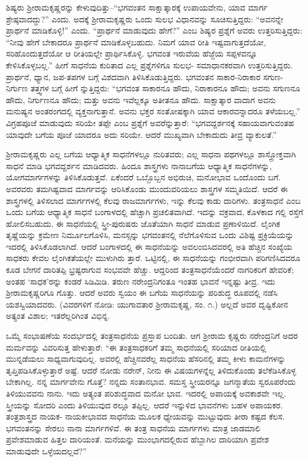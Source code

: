 ಶಿಷ್ಯರು ಶ್ರೀರಾಮಕೃಷ್ಣರನ್ನು ಕೇಳುವುದಿತ್ತು–“ಭಗವಂತನ ಸಾಕ್ಷಾತ್ಕಾರಕ್ಕೆ ಉಪಾಯವೇನು, ಯಾವ ಮಾರ್ಗ ಶ್ರೇಷ್ಠವಾದದ್ದು?” ಎಂದು. ಅದಕ್ಕೆ ಶ್ರೀರಾಮಕೃಷ್ಣರು ಒಂದು ಸುಲಭ ವಿಧಾನವನ್ನು ಸೂಚಿಸುತ್ತಿದ್ದರು: “ಅವನನ್ನೇ ಪ್ರಾರ್ಥನೆ ಮಾಡಿಕೊಳ್ಳಿ!” ಎಂದು. “ಪ್ರಾರ್ಥನೆ ಮಾಡುವುದು ಹೇಗೆ?” ಎಂಬ ಶಿಷ್ಯರ ಪ್ರಶ್ನೆಗೆ ಅವರು ಉತ್ತರಿಸುತ್ತಿದ್ದರು: “ನೀವು ಹೇಗೆ ಬೇಕಾದರೂ ಪ್ರಾರ್ಥನೆ ಮಾಡಿಕೊಳ್ಳಬಹುದು. ನಿಮಗೆ ಯಾವ ರೀತಿ ಇಷ್ಟವಾಗುತ್ತದೆಯೋ, ಸರಿಹೊಂದುತ್ತದೆಯೋ ಆ ರೀತಿಯಲ್ಲೇ ಪ್ರಾರ್ಥಿಸಿಕೊಳ್ಳಿ. ಭಗವಂತ ಇರುವೆಯ ಹೆಜ್ಜೆಯ ಸಪ್ಪಳವನ್ನೂ ಕೇಳಿಸಿಕೊಳ್ಳಬಲ್ಲ.” ಹೀಗೆ ಸಾಧನೆಯ ಕುರಿತಾದ ಎಲ್ಲ ಪ್ರಶ್ನೆಗಳಿಗೂ ಸುಲಭ- ಸಮಾಧಾನಕರವಾಗಿ ಉತ್ತರಿಸುತ್ತಿದ್ದರು. ಪ್ರಾರ್ಥನೆ, ಧ್ಯಾನ, ಜಪ-ತಪಗಳ ಬಗ್ಗೆ ವಿಶದವಾಗಿ ತಿಳಿಸಿಕೊಡುತ್ತಿದ್ದರು. ಭಗವಂತನ ಸಾಕಾರ-ನಿರಾಕಾರ ಸಗುಣ-ನಿರ್ಗುಣ ತತ್ತ್ವಗಳ ಬಗ್ಗೆ ಹೀಗೆ ನ್ನುತ್ತಿದ್ದರು: “ಭಗವಂತ ಸಾಕಾರನೂ ಹೌದು, ನಿರಾಕಾರನೂ ಹೌದು; ಅವನು ಸಗುಣನೂ ಹೌದು, ನಿರ್ಗುಣನೂ ಹೌದು; ಮತ್ತು ಅವನು ಇವೆಲ್ಲಕ್ಕೂ ಅತೀತನೂ ಹೌದು. ಸಾಕ್ಷಾತ್ಕಾರ ವಾದಾಗ ಅವನು ಮನುಷ್ಯನ ಅಂತರಂಗದಲ್ಲಿ ವ್ಯಕ್ತನಾಗುತ್ತಾನೆ. ಅವನು ಭಕ್ತರ ಸಂತೋಷಕ್ಕಾಗಿ ಯಾವ ಆಕಾರವನ್ನಾದರೂ ತಳೆಯಬಲ್ಲ.” ವಿಗ್ರಹಪೂಜೆ ಮಾಡುವುದು ಸರಿಯೇ ತಪ್ಪೇ ಎಂಬ ಪ್ರಶ್ನೆಗೆ ಅವರೆನ್ನುತ್ತಾರೆ: “ಭಗವದ್ದರ್ಶನಕ್ಕೆ ಸಹಾಯವಾಗುವಂತಹ ಯಾವುದೇ ಬಗೆಯ ಪೂಜೆ ಯಾದರೂ ಅದು ಸರಿಯೇ. ಆದರೆ ಮುಖ್ಯವಾಗಿ ಬೇಕಾದುದು ತೀವ್ರ ವ್ಯಾಕುಲತೆ.”

ಶ್ರೀರಾಮಕೃಷ್ಣರು ಎಲ್ಲ ಬಗೆಯ ಆಧ್ಯಾತ್ಮಿಕ ಸಾಧನೆಗಳಲ್ಲೂ ನುರಿತವರು; ಎಲ್ಲ ಸಾಧನಾ ಪಥಗಳಲ್ಲೂ ಶಾಸ್ತ್ರೋಕ್ತವಾಗಿ ಸಾಧನೆ ಮಾಡಿ ಭಗವದ್ದರ್ಶನ ಮಾಡಿದವರು. ಹಿಂದೂ ಶಾಸ್ತ್ರಗಳು ನಾನಾಬಗೆಯ ಆಧ್ಯಾತ್ಮಿಕ ಸಾಧನೆಗಳನ್ನು, ಯೋಗಮಾರ್ಗಗಳನ್ನು ತಿಳಿಸಿಕೊಡುತ್ತವೆ. ಏಕೆಂದರೆ ಒಬ್ಬೊಬ್ಬನ ಅಭಿರುಚಿ, ಮನೋಭಾವ ಒಂದೊಂದು ಬಗೆ. ಅವರವರು ತಮಗಿಷ್ಟವಾದ ಮಾರ್ಗವನ್ನು ಆರಿಸಿಕೊಂಡು ಮುಂದುವರಿಯಲು ಶಾಸ್ತ್ರಗಳ ಸಮ್ಮತಿಯಿದೆ. ಆದರೆ ಈ ಶಾಸ್ತ್ರಗಳಲ್ಲಿ ತಿಳಿಸಲಾದ ಮಾರ್ಗಗಳಲ್ಲಿ ಕೆಲವು ರಾಜಮಾರ್ಗಗಳು, ಇನ್ನು ಕೆಲವು ಕಾಡು ದಾರಿಗಳು. ತಂತ್ರಸಾಧನೆ ಎಂಬ ಒಂದು ಬಗೆಯ ಆಧ್ಯಾತ್ಮಿಕ ಸಾಧನೆ ಬಂಗಾಳದಲ್ಲಿ ಹೆಚ್ಚಾಗಿ ಪ್ರಚಲಿತವಾಗಿದೆ. ಇದನ್ನು ವಕ್ರವಾದ, ಕೊಳಕಾದ ಗಲ್ಲಿ ರಸ್ತೆಗೆ ಹೋಲಿಸಬಹುದು. ಈ ಸಾಧನೆಯಲ್ಲಿ ಸ್ತ್ರೀ-ಪುರುಷರು ಜೊತೆಯಾಗಿ ಸಾಧನೆ ಮಾಡುವ ಪ್ರಣಾಳಿಯಿದೆ. ಲೈಂಗಿಕ ತೃಷ್ಣೆಯನ್ನು ಕ್ರಮೇಣ ನಿರ್ಮೂಲಗೊಳಿಸಿ, ಮನಸ್ಸನ್ನು ಭಗವಂತನಲ್ಲಿ ನೆಲೆಗೊಳಿಸುವ ಒಂದು ವಿಶಿಷ್ಟ ಪ್ರಕ್ರಿಯೆಯನ್ನು ಇದರಲ್ಲಿ ತಿಳಿಸಿಕೊಡಲಾಗಿದೆ. ಆದರೆ ಬಂಗಾಳದಲ್ಲಿ ಈ ಸಾಧನೆಯನ್ನು ಅವಲಂಬಿಸಿದವರಲ್ಲಿ ಅತಿ ಹೆಚ್ಚಿನ ಸಂಖ್ಯೆಯ ಸಾಧಕರು ಕೇವಲ ಲೈಂಗಿಕತೆಯಲ್ಲೇ ಮುಳುಗಿರು ತ್ತಾರೆ. ಒಟ್ಟಿನಲ್ಲಿ, ಈ ಸಾಧನೆಯನ್ನು ಗಂಭೀರವಾಗಿ ಪರಿಗಣಿಸಿದವರೂ ಕೂಡ ಬೇಗನೆ ದಾರಿತಪ್ಪಿ ಭ್ರಷ್ಟರಾಗುವ ಸಂಭವವೇ ಹೆಚ್ಚು. ಆದ್ದರಿಂದ ತಂತ್ರಸಾಧನೆಯೆಂದರೆ ನಾಗರಿಕರಿಗೆ ಹೇವರಿಕೆ; ಅಂತಹ ‘ಸಾಧಕ’ರನ್ನು ಕಂಡರೆ ಸಿಡಿಮಿಡಿ. ತರುಣ ನರೇಂದ್ರನಿಗಂತೂ ಇಂತಹ ಭಾವನೆ ಇನ್ನಷ್ಟು ತೀವ್ರ. ಇದು ಶ್ರೀರಾಮಕೃಷ್ಣರಿಗೂ ಗೊತ್ತು. ಆದರೆ ಅವರು ಸ್ವಯಂ ಈ ಬಗೆಯ ಸಾಧನೆಯನ್ನು ಪರಿಶುದ್ಧ ರೂಪದಲ್ಲಿ ನಡೆಸಿ ಯಶಸ್ವಿಯಾದವರು. (ವಿವರಗಳಿಗೆ ನೋಡಿ: ಯುಗಾವತಾರ ಶ್ರೀರಾಮಕೃಷ್ಣ, ಸಂ. ೧.) ಅಲ್ಲದೆ ಅವರ ದೃಷ್ಟಿಕೋನ ಅತ್ಯಂತ ವಿಶಾಲ; ಇತರೆಲ್ಲರಿಗಿಂತ ವಿಭಿನ್ನ.

ಒಮ್ಮೆ ಸಂಭಾಷಣೆಯ ಸಂದರ್ಭದಲ್ಲಿ ತಂತ್ರಸಾಧನೆಯ ಪ್ರಸ್ತಾಪ ಬಂದಿತು. ಆಗ ಶ್ರೀರಾಮ ಕೃಷ್ಣರು ನರೇಂದ್ರನಿಗೆ ಅದರ ಮರ್ಮವನ್ನು ವಿವರಿಸುತ್ತ ಹೇಳುತ್ತಾರೆ: “ಈ ತಂತ್ರಸಾಧಕರಿಗೆ ತಮ್ಮ ಸಾಧನೆಯಲ್ಲಿ ಸರಿಯಾದ ರೀತಿಯಲ್ಲಿ ಮುನ್ನಡೆಯಲು ಸಾಧ್ಯವಾಗುವುದಿಲ್ಲ. ಅವರಲ್ಲಿ ಹೆಚ್ಚಿನವರೆಲ್ಲ ಸಾಧನೆಯ ಹೆಸರಿನಲ್ಲಿ ತಮ್ಮ ಕೀಳು ಕಾಮನೆಗಳನ್ನು ತೃಪ್ತಿಪಡಿಸಿಕೊಳ್ಳುತ್ತಾರೆ ಅಷ್ಟೆ. ಆದರೆ ನೋಡು ನರೇನ್, ನೀನು ಈ ವಿಷಯಗಳನ್ನೆಲ್ಲ ತಿಳಿದುಕೊಂಡು ತಲೆಕೆಡಿಸಿಕೊಳ್ಳ ಬೇಕಾಗಿಲ್ಲ. ನನ್ನ ಮಾರ್ಗವೇನು ಗೊತ್ತೆ? ನನ್ನದು ಸಂತಾನಭಾವ. ಸಮಸ್ತ ಸ್ತ್ರೀಯರನ್ನೂ ಜಗನ್ಮಾತೆಯ ಸ್ವರೂಪರೆಂದು ತಿಳಿಯುವವನು ನಾನು. ಇದು ಅತ್ಯಂತ ಪರಿಶುದ್ಧವಾದ ಮನೋ ಭಾವ. ಇದರಲ್ಲಿ ಅಪಾಯಕ್ಕೆ ಅವಕಾಶವೇ ಇಲ್ಲ. ಸ್ತ್ರೀಯನ್ನು ಸೋದರಿ ಎಂದು ತಿಳಿಯುವುದ ರಲ್ಲೂ ತಪ್ಪಿಲ್ಲ. ಆದರೆ ಇನ್ನುಳಿದ ಭಾವನೆಗಳು ಬಹಳ ಅಪಾಯಕರ. ತಂತ್ರಶಾಸ್ತ್ರದ ನಾಯಕ- ನಾಯಕೀಭಾವದ ಸಾಧನೆಯ ಮೂಲಕ ಧ್ಯೇಯವನ್ನು ಮುಟ್ಟುವುದು ತೀರಾ ಕಷ್ಟದ ಕೆಲಸ. ಭಗವಂತನನ್ನು ಸೇರಲು ನಾನಾ ಮಾರ್ಗಗಳಿವೆ. ಈ ತಂತ್ರ ಸಾಧನೆಯ ಮಾರ್ಗಗಳು ಮಾತ್ರ ಜಾಡಮಾಲಿ ಪ್ರವೇಶಮಾಡುವ ಹಿತ್ತಲ ದಾರಿಯಂತೆ. ಮನೆಯನ್ನು ಮುಂಭಾಗದಲ್ಲಿರುವ ಹೆಬ್ಬಾಗಿಲ ದಾರಿಯಾಗಿ ಪ್ರವೇಶ ಮಾಡುವುದೇ ಒಳ್ಳೆಯದಲ್ಲವೆ?”

